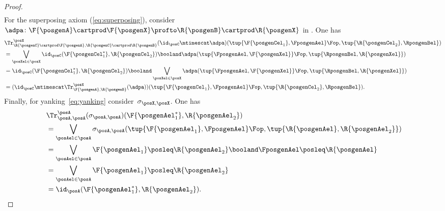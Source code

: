 \begin{proof}
\begin{equation}
\begin{aligned}
		\end{aligned}
	\end{equation}
	For the superposing axiom (\cref{eq:superposing}), consider~$\adpa\colon \F{\posgenA}\cartprod \F{\posgenX}\profto \R{\posgenB}\cartprod \R{\posgenX}$ in \DP.
	One has
	\begin{equation}
		\begin{aligned}
			{}
			 & \Tr_{\R{\posgenC}\cartprod \F{\posgenA},\R{\posgenC}\cartprod \R{\posgenB}}^{\posX}(\id_\posC\mtimescat \adpa)(\tup{\F{\posgenCel_1},\FposgenAel}\Fop,\tup{\R{\posgenCel_2},\RposgenBel}) \\
			 & = \bigvee_{\posXel \in \posX} \id_\posC(\F{\posgenCel_1^*},\R{\posgenCel_2})\booland \adpa(\tup{\FposgenAel,\F{\posgenXel}}\Fop,\tup{\RposgenBel,\R{\posgenXel}})                         \\
			 & =\id_\posC(\F{\posgenCel_1^*},\R{\posgenCel_2}) \booland \bigvee_{\posXel\in \posX} \adpa(\tup{\FposgenAel,\F{\posgenXel}}\Fop,\tup{\RposgenBel,\R{\posgenXel}})                          \\
			 & =(\id_\posC \mtimescat \Tr_{\F{\posgenA},\R{\posgenB}}^\posX(\adpa))(\tup{\F{\posgenCel_1},\FposgenAel}\Fop,\tup{\R{\posgenCel_2},\RposgenBel}).
		\end{aligned}
	\end{equation}
	Finally, for yanking~\cref{eq:yanking} consider~$\sigma_{\posX,\posX}$.
	One has
	\begin{equation}
		\begin{aligned}
			~ & \Tr_{\posA,\posA}^{\posA}(\sigma_{\posA,\posA})(\F{\posgenAel_1^*},\R{\posgenAel_2})                                            \\
			  & = \bigvee_{\posAel\in \posA} \sigma_{\posA,\posA}(\tup{\F{\posgenAel_1},\FposgenAel}\Fop,\tup{\R{\posgenAel},\R{\posgenAel_2}}) \\
			  & =\bigvee_{\posAel\in \posA} \F{\posgenAel_1} \posleq \R{\posgenAel_2} \booland \FposgenAel\posleq \R{\posgenAel}                \\
			  & =\bigvee_{\posAel\in \posA} \F{\posgenAel_1} \posleq \R{\posgenAel_2}                                                           \\
			  & =\id_\posA(\F{\posgenAel_1^*},\R{\posgenAel_2}).
		\end{aligned}
	\end{equation}
\end{proof}
